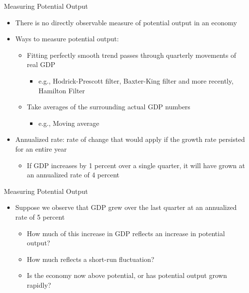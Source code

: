 \documentclass[aspectratio=1610]{beamer}
\begin{document}
\begin{frame}[wide]{Measuring Potential Output}
	\begin{itemize}
		\item There is no directly observable measure of potential output in an economy
		\item Ways to measure potential output:
		\begin{itemize}
			\item Fitting perfectly smooth trend passes through quarterly movements of real GDP
			\begin{itemize}
				\item e.g., Hodrick-Prescott filter, Baxter-King filter and more recently, Hamilton Filter
			\end{itemize}
			\item Take averages of the surrounding actual GDP numbers
			\begin{itemize}
				\item e.g., Moving average
			\end{itemize}
		\end{itemize}
		\item Annualized rate: rate of change that would apply if the growth rate persisted for an entire year
		\begin{itemize}
			\item If GDP increases by 1 percent over a single quarter, it will have grown at an annualized rate of 4 percent
		\end{itemize}		
	\end{itemize}
\end{frame}

\begin{frame}[wide]{Measuring Potential Output}
	\begin{itemize}
		\item Suppose we observe that GDP grew over the last quarter at an annualized rate of 5 percent
		\begin{itemize}
			\item How much of this increase in GDP reflects an increase in potential output?
			\item How much reflects a short-run fluctuation? 
			\item Is the economy now above potential, or has potential output grown rapidly?
		\end{itemize}
	\end{itemize}
\end{frame}
\end{document}
